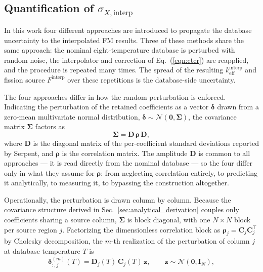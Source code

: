 \documentclass{style/nseJournal}
\begin{document}
\subsection{Quantification of $\sigma_{X,\text{interp}}$}
\label{sec:four_methods}

In this work four different approaches are introduced to propagate the database uncertainty to the interpolated FM results. Three of these methods share the same approach: the nominal eight-temperature database is perturbed with random noise, the interpolator and correction of Eq.~(\ref{eqn:ctcr}) are reapplied, and the procedure is repeated many times. The spread of the resulting $k_{\text{eff}}^{\text{interp}}$ and fission source $F^{\text{interp}}$ over these repetitions is the database-side uncertainty. %

The four approaches differ in how the random perturbation is enforced. Indicating the perturbation of the retained coefficients as a vector $\boldsymbol\delta$ drawn from a zero-mean multivariate normal distribution, $\boldsymbol\delta\sim\mathcal{N}(\mathbf{0},\boldsymbol\Sigma)$, the covariance matrix $\boldsymbol\Sigma$ factors as
\begin{equation}
  \boldsymbol\Sigma = \mathbf{D}\,\boldsymbol\rho\,\mathbf{D},
  \label{eqn:sigma_factor}
\end{equation}
where $\mathbf{D}$ is the diagonal matrix of the per-coefficient standard deviations reported by Serpent, and $\boldsymbol\rho$ is the correlation matrix. The amplitude $\mathbf{D}$ is common to all approaches --- it is read directly from the nominal database --- so the four differ only in what they assume for $\boldsymbol\rho$: from neglecting correlation entirely, to predicting it analytically, to measuring it, to bypassing the construction altogether.

Operationally, the perturbation is drawn column by column. Because the covariance structure derived in Sec.~\ref{sec:analytical_derivation} couples only coefficients sharing a source column, $\boldsymbol\Sigma$ is block diagonal, with one $N\times N$ block per source region $j$. Factorizing the dimensionless correlation block as $\boldsymbol\rho_j=\mathbf{C}_j \mathbf{C}_j^{\!\top}$ by Cholesky decomposition, the $m$-th realization of the perturbation of column $j$ at database temperature $T$ is 
\begin{equation}   \boldsymbol\delta^{(m)}_{:,j}(T) = \mathbf{D}_j(T)\,\mathbf{C}_j(T)\,\mathbf{z}, \qquad \mathbf{z}\sim\mathcal{N}(\mathbf{0},\mathbf{I}_N),  
\label{eqn:cholesky_draw}
\end{equation}
\end{document}
